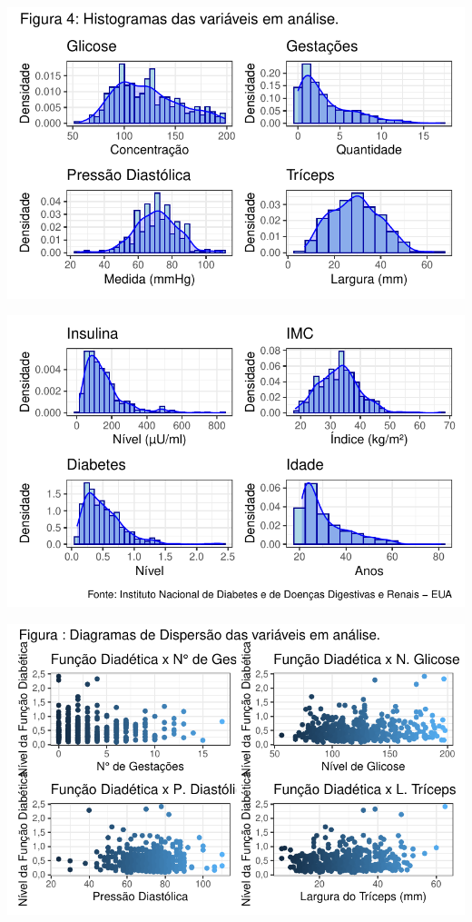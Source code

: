 \documentclass[
  twocolumn,
  landscape]{report}
\begin{document}
\includegraphics{relatorio_lab1_files/figure-pdf/unnamed-chunk-10-1.pdf}

\includegraphics{relatorio_lab1_files/figure-pdf/unnamed-chunk-10-2.pdf}

\includegraphics{relatorio_lab1_files/figure-pdf/unnamed-chunk-11-1.pdf}
\end{document}
